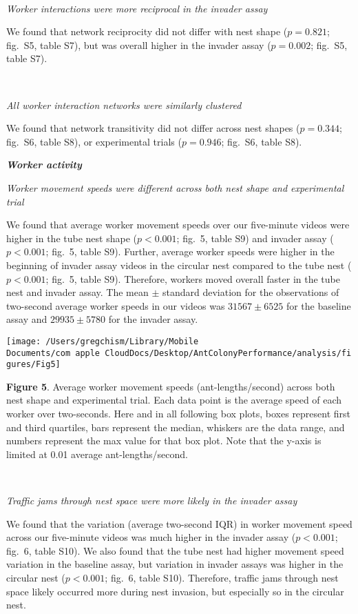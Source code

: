 \documentclass[3p]{elsarticle} %
\begin{document}
~

\emph{Worker interactions were more reciprocal in the invader assay}

We found that network reciprocity did not differ with nest shape
(\(p = 0.821\); fig.~S5, table S7), but was overall higher in the
invader assay (\(p = 0.002\); fig.~S5, table S7).

~

\emph{All worker interaction networks were similarly clustered}

We found that network transitivity did not differ across nest shapes
(\(p = 0.344\); fig.~S6, table S8), or experimental trials
(\(p = 0.946\); fig.~S6, table S8).

\textbf{\emph{Worker activity}}

\emph{Worker movement speeds were different across both nest shape and
experimental trial}

We found that average worker movement speeds over our five-minute videos
were higher in the tube nest shape (\(p < 0.001\); fig.~5, table S9) and
invader assay (\(p < 0.001\); fig.~5, table S9). Further, average worker
speeds were higher in the beginning of invader assay videos in the
circular nest compared to the tube nest (\(p < 0.001\); fig.~5, table
S9). Therefore, workers moved overall faster in the tube nest and
invader assay. The mean \(\pm\) standard deviation for the observations
of two-second average worker speeds in our videos was \(31567\pm6525\)
for the baseline assay and \(29935\pm5780\) for the invader assay.

\begin{flushleft}\texttt{[image: /Users/gregchism/Library/Mobile Documents/com~apple~CloudDocs/Desktop/AntColonyPerformance/analysis/figures/Fig5]} \end{flushleft}

\textbf{Figure 5}. Average worker movement speeds (ant-lengths/second)
across both nest shape and experimental trial. Each data point is the
average speed of each worker over two-seconds. Here and in all following
box plots, boxes represent first and third quartiles, bars represent the
median, whiskers are the data range, and numbers represent the max value
for that box plot. Note that the y-axis is limited at 0.01 average
ant-lengths/second.

~

\emph{Traffic jams through nest space were more likely in the invader
assay}

We found that the variation (average two-second IQR) in worker movement
speed across our five-minute videos was much higher in the invader assay
(\(p < 0.001\); fig.~6, table S10). We also found that the tube nest had
higher movement speed variation in the baseline assay, but variation in
invader assays was higher in the circular nest (\(p < 0.001\); fig.~6,
table S10). Therefore, traffic jams through nest space likely occurred
more during nest invasion, but especially so in the circular nest.
\end{document}
